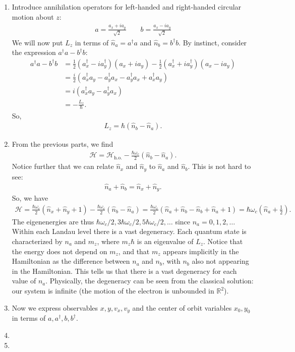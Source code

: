 \documentclass{article}
\theoremstyle{definition}
\newcommand{\ham}{\mathcal{H}}
\newcommand{\f}[2]{\frac{#1}{#2}}
\newcommand{\lp}{\left(}
\newcommand{\rp}{\right)}
\begin{document}
\begin{enumerate}[label=\alph*)]
	\item Introduce annihilation operators for left-handed and right-handed circular motion about $z$:
	\begin{align*}
		a = \f{a_x + ia_y}{\sqrt{2}} \quad\quad b = \f{a_x - i a_y}{\sqrt{2}}
	\end{align*}
	We will now put $L_z$ in terms of $\hat{n}_{a} = a^\dagger a $ and $\hat{n}_b = b^\dagger b$. By instinct, consider the expression $a^\dagger a - b^\dagger b$:
	\begin{align*}
		a^\dagger a - b^\dagger b 
		&= \f{1}{2}\lp a_x^\dagger - i a_y^\dagger \rp \lp a_x + i a_y \rp - \f{1}{2}\lp a_x^\dagger + ia_y^\dagger \rp \lp a_x -ia_y \rp\\
		&= \f{i}{2}\lp a_x^\dagger a_y - a_y^\dagger a_x - a_y^\dagger a_x + a_x^\dagger a_y \rp \\
		&= i\lp a_x^\dagger a_y - a_y^\dagger a_x \rp\\
		&= -\f{L_z}{\hbar}.
	\end{align*}
	So,
	\begin{align*}
		L_z = \hbar (\hat{n}_b - \hat{n}_a).
	\end{align*}
	
	
	\item From the previous parts, we find
	\begin{align*}
		\ham = \ham_\text{h.o.} - \f{\hbar\omega_c}{2} (\hat{n}_b - \hat{n}_a).
	\end{align*}
	Notice further that we can relate $\hat{n}_x$ and $\hat{n}_y$ to $\hat{n}_a$ and $\hat{n}_b$. This is not hard to see:
	\begin{align*}
		\hat{n}_a + \hat{n}_b =  \hat{n}_x + \hat{n}_y.
	\end{align*}	
	So, we have
	\begin{align*}
		\ham = \f{\hbar \omega_c}{2}\lp \hat{n}_x + \hat{n}_y + 1\rp - \f{\hbar \omega_c}{2}\lp \hat{n}_b - \hat{n}_a \rp = \f{\hbar \omega_c}{2}\lp \hat{n}_a + \hat{n}_b  -  \hat{n}_b + \hat{n}_a + 1\rp = \hbar \omega_c \lp \hat{n}_a + \f{1}{2} \rp. 
	\end{align*}
	The eigenenergies are thus $\hbar \omega_c/2, 3\hbar \omega_c/2, 5\hbar \omega_c/2,\dots$ since $n_a = 0,1,2,\dots$ Within each Landau level there is a vast degeneracy. Each quantum state is characterized by $n_a$ and $m_z$, where $m_z \hbar$ is an eigenvalue of $L_z$. Notice that the energy does not depend on $m_z$, and that $m_z$ appears implicitly in the Hamiltonian as the difference between $n_a$ and $n_b$, with $n_b$ also not appearing in the Hamiltonian. This tells us that there is a vast degeneracy for each value of $n_a$. Physically, the degeneracy can be seen from the classical solution: our system is infinite (the motion of the electron is unbounded in $\mathbb{R}^2$).

	\item Now we express observables $x,y,v_x,v_y$ and the center of orbit variables $x_0,y_0$ in terms of $a,a^\dagger,b,b^\dagger$. 
	
	\item 
	
	\item 
\end{enumerate}
\end{document}
